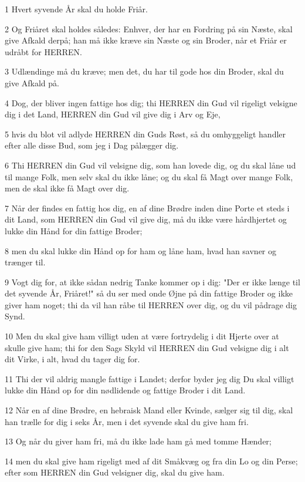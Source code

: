 \par 1 Hvert syvende År skal du holde Friår.
\par 2 Og Friåret skal holdes således: Enhver, der har en Fordring på sin Næste, skal give Afkald derpå; han må ikke kræve sin Næste og sin Broder, når et Friår er udråbt for HERREN.
\par 3 Udlændinge må du kræve; men det, du har til gode hos din Broder, skal du give Afkald på.
\par 4 Dog, der bliver ingen fattige hos dig; thi HERREN din Gud vil rigeligt velsigne dig i det Land, HERREN din Gud vil give dig i Arv og Eje,
\par 5 hvis du blot vil adlyde HERREN din Guds Røst, så du omhyggeligt handler efter alle disse Bud, som jeg i Dag pålægger dig.
\par 6 Thi HERREN din Gud vil velsigne dig, som han lovede dig, og du skal låne ud til mange Folk, men selv skal du ikke låne; og du skal få Magt over mange Folk, men de skal ikke få Magt over dig.
\par 7 Når der findes en fattig hos dig, en af dine Brødre inden dine Porte et steds i dit Land, som HERREN din Gud vil give dig, må du ikke være hårdhjertet og lukke din Hånd for din fattige Broder;
\par 8 men du skal lukke din Hånd op for ham og låne ham, hvad han savner og trænger til.
\par 9 Vogt dig for, at ikke sådan nedrig Tanke kommer op i dig: "Der er ikke længe til det syvende År, Friåret!" så du ser med onde Øjne på din fattige Broder og ikke giver ham noget; thi da vil han råbe til HERREN over dig, og du vil pådrage dig Synd.
\par 10 Men du skal give ham villigt uden at være fortrydelig i dit Hjerte over at skulle give ham; thi for den Sags Skyld vil HERREN din Gud velsigne dig i alt dit Virke, i alt, hvad du tager dig for.
\par 11 Thi der vil aldrig mangle fattige i Landet; derfor byder jeg dig Du skal villigt lukke din Hånd op for din nødlidende og fattige Broder i dit Land.
\par 12 Når en af dine Brødre, en hebraisk Mand eller Kvinde, sælger sig til dig, skal han trælle for dig i seks År, men i det syvende skal du give ham fri.
\par 13 Og når du giver ham fri, må du ikke lade ham gå med tomme Hænder;
\par 14 men du skal give ham rigeligt med af dit Småkvæg og fra din Lo og din Perse; efter som HERREN din Gud velsigner dig, skal du give ham.

